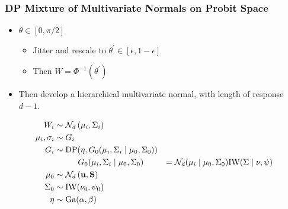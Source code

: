 \documentclass[aspectratio=169]{beamer}
\begin{document}
\begin{frame}
  \frametitle{DP Mixture of Multivariate Normals on Probit Space}
  \begin{itemize}
    \item $\theta \in [0,\pi/2]$
      \begin{itemize}
        \item Jitter and rescale to $\theta^{\prime} \in [\epsilon, 1 - \epsilon]$
        \item Then $W = \Phi^{-1}(\theta^{\prime})$
      \end{itemize}
    \item Then develop a hierarchical multivariate normal, with length of response $d-1$.
  \end{itemize}
  \begin{equation*}
    \begin{aligned}
      W_i &\sim \mathcal{N}_d\left(\mu_i, \Sigma_i\right)\\
      \mu_i, \sigma_i &\sim G_i\\
      G_i &\sim \text{DP}(\eta, G_0(\mu_i,\Sigma_i\mid\mu_0,\Sigma_0))\\
      &\hspace{1cm}G_0(\mu_i,\Sigma_i\mid\mu_0,\Sigma_0) &=
          \mathcal{N}_d(\mu_i\mid\mu_0,\Sigma_0)\text{IW}(\Sigma\mid\nu,\psi)\\
      \mu_0 &\sim \mathcal{N}_d\left({\bf u},{\bf S}\right)\\
      \Sigma_0 &\sim \text{IW}(\nu_0,\psi_0)\\
      \eta &\sim \text{Ga}(\alpha, \beta)
    \end{aligned}
  \end{equation*}
\end{frame}
\end{document}
